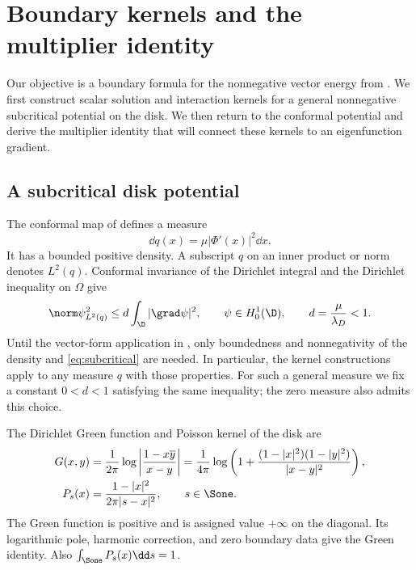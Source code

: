 \section{Boundary kernels and the multiplier identity}\label{sec:boundary}

Our objective is a boundary formula for the nonnegative vector energy from . We first construct scalar solution and interaction kernels for a general nonnegative subcritical potential on the disk. We then return to the conformal potential and derive the multiplier identity that will connect these kernels to an eigenfunction gradient.

\subsection{A subcritical disk potential}

The conformal map of  defines a measure
\begin{equation}\label{eq:q}
\dd q(x)=\mu|\Phi'(x)|^2\dd x.
\end{equation}
It has a bounded positive density. A subscript $q$ on an inner product or norm denotes $L^2(q)$. Conformal invariance of the Dirichlet integral and the Dirichlet inequality on $\Omega$ give
\begin{equation}\label{eq:subcritical}
\norm\psi_{L^2(q)}^2\le d\int_\D|\grad\psi|^2,
\qquad \psi\in H^1_0(\D),\qquad d=\frac\mu{\lambda_D}<1.
\end{equation}
Until the vector-form application in , only boundedness and nonnegativity of the density and \eqref{eq:subcritical} are needed. In particular, the kernel constructions apply to any measure $q$ with those properties.
For such a general measure we fix a constant $0<d<1$ satisfying the same inequality; the zero measure also admits this choice.

The Dirichlet Green function and Poisson kernel of the disk are
\begin{align}
G(x,y)&=\frac1{2\pi}\log\left|\frac{1-x\overline y}{x-y}\right|
=\frac1{4\pi}\log\left(1+\frac{(1-|x|^2)(1-|y|^2)}{|x-y|^2}\right),\label{eq:green}\\
P_s(x)&=\frac{1-|x|^2}{2\pi|s-x|^2},\qquad s\in\Sone.\label{eq:poisson}
\end{align}
The Green function is positive and is assigned value $+\infty$ on the diagonal. Its logarithmic pole, harmonic correction, and zero boundary data give the Green identity. Also $\int_{\Sone}P_s(x)\dd s=1$.

